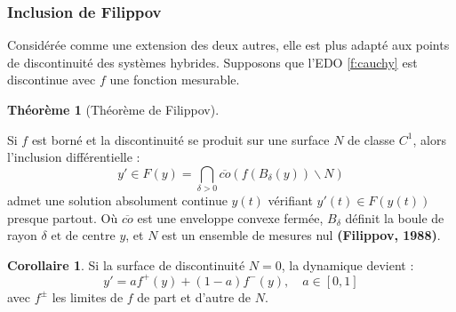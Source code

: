 \documentclass[12pt, oneside]{report} %
\theoremstyle{definition}
\newtheorem{thm}{\textbf{Théorème}}[section]
\newtheorem{cor}{\textbf{Corollaire}}[section]
\theoremstyle{remark}
\begin{document}
\subsubsection*{Inclusion de Filippov} 
Considérée comme une extension des deux autres, elle est plus adapté aux points de discontinuité des systèmes hybrides. Supposons que l'EDO \eqref{f:cauchy} est discontinue avec ${f}$ une fonction mesurable.
\begin{thm}[Théorème de Filippov] \
	
	Si ${f}$ est borné et la discontinuité se produit sur une surface $N$ de classe $C^1$, alors l'inclusion différentielle : 
	\begin{equation}\label{f:filippov}
		y' \in F(y) = \bigcap_{\delta >0} \overline{co} \left({f}\left(B_{\delta}(y)  \right) \backslash N \right)
	\end{equation}
	admet une solution absolument continue $y(t)$ vérifiant $y'(t) \in F(y(t))$ presque partout. Où $\overline{co} $ est une enveloppe convexe fermée, $B_{\delta}$ définit la boule de rayon $\delta \text{ et de centre }y$, et $N$ est un ensemble de mesures nul \textbf{(Filippov, 1988)}.  
	\end{thm}
	
	\begin{cor}
		Si la surface de discontinuité $N = 0 $, la dynamique devient : 
		\begin{equation}
			y' = a{f}^+(y)+ (1-a){f}^-(y), \quad a \in \left[0, 1\right] 
		\end{equation}
		avec ${f}^{\pm} $ les limites de ${f}$ de part et d'autre de $N$.
	\end{cor}
	
\end{document}
